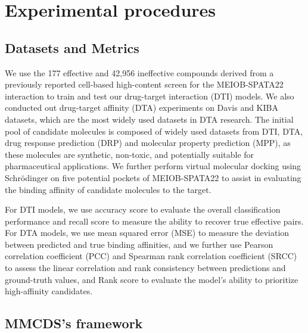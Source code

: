 \documentclass[preprint,12pt]{elsarticle}
\theoremstyle{plain}
\theoremstyle{definition}
\theoremstyle{remark}
\begin{document}
\section*{Experimental procedures}

\subsection*{Datasets and Metrics}

We use the 177 effective and 42,956 ineffective compounds derived from a previously reported cell-based high-content screen for the MEIOB-SPATA22 interaction \cite{67} to train and test our drug-target interaction (DTI) models.
We also conducted out drug-target affinity (DTA) experiments on Davis \cite{52} and KIBA \cite{53} datasets, which are the most widely used datasets in DTA research.
The initial pool of candidate molecules is composed of widely used datasets from DTI, DTA, drug response prediction (DRP) and molecular property prediction (MPP), as these molecules are synthetic, non-toxic, and potentially suitable for pharmaceutical applications.
We further perform virtual molecular docking using Schrödinger on five potential pockets of MEIOB-SPATA22 to assist in evaluating the binding affinity of candidate molecules to the target.

For DTI models, we use accuracy score to evaluate the overall classification performance and recall score to measure the ability to recover true effective pairs.
For DTA models, we use mean squared error (MSE) to measure the deviation between predicted and true binding affinities, and we further use Pearson correlation coefficient (PCC) and Spearman rank correlation coefficient (SRCC) to assess the linear correlation and rank consistency between predictions and ground-truth values, and Rank score \cite{47} to evaluate the model’s ability to prioritize high-affinity candidates.



\subsection*{MMCDS's framework}
\end{document}
